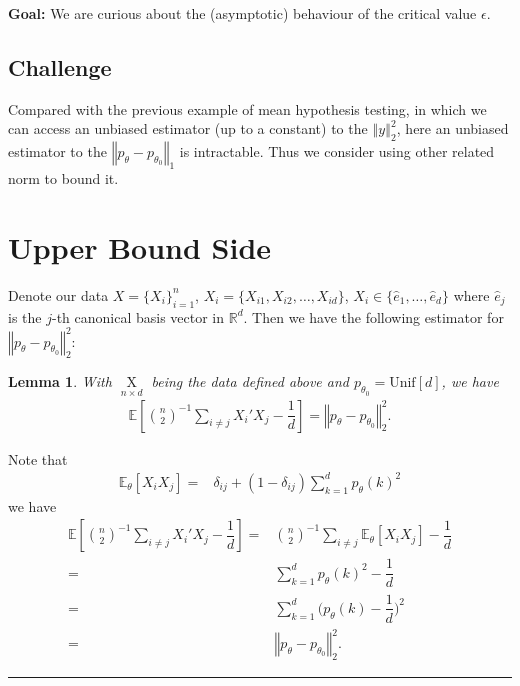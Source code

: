 \documentclass[twoside,12pt]{article}
\newtheorem{lemma}[theorem]{Lemma}
\newenvironment{proof}{{\bf Proof:}}{\hfill\rule{2mm}{2mm}}
\begin{document}
\textbf{Goal:} We are curious about the (asymptotic) behaviour of the critical value $ \epsilon  $.

\subsection{Challenge}

Compared with the previous example of mean hypothesis testing, in which we can access an unbiased estimator (up to a constant) to the $ \left\Vert y \right\Vert _2^2 $, here an unbiased estimator to the $ \left\Vert p_\theta -p_{\theta _0}  \right\Vert  _1 $ is intractable. Thus we consider using other related norm to bound it.






\section{Upper Bound Side}



Denote our data $ X = \{X_i\}_{i=1}^n $, $ X_i = \{X_{i1},X_{i2},\ldots,X_{id}\} $, $ X_i \in \{\hat{e}_1,\ldots,\hat{e}_{d}\} $ where $ \hat{e}_{j} $ is the $ j $-th canonical basis vector in $ \mathbb{R}^d $. Then we have the following estimator for $ \left\Vert p_\theta - p_{\theta _0} \right\Vert _2^2 $:

\begin{lemma}
   With $ \mathop{ X }\limits_{n\times d}  $ being the data defined above and $ p_{\theta _0} = \mathrm{ Unif }[d] $, we have
   \begin{align*}
      \mathbb{E}\left[ \binom{n}{2}^{-1}\sum_{i\neq j}X_i'X_j - \dfrac{ 1 }{ d } \right] = \left\Vert p_\theta -p_{\theta _0} \right\Vert _2^2  .
   \end{align*}
   
\end{lemma}

\begin{proof}
   Note that
   \begin{align*}
      \mathbb{E}_\theta \left[ X_iX_j \right]  =& \delta _{ij} + (1-\delta _{ij})\sum_{k=1}^dp_\theta (k)^2
   \end{align*}
   we have
   \begin{align*}
      \mathbb{E}\left[ \binom{n}{2}^{-1}\sum_{i\neq j}X_i'X_j - \dfrac{ 1 }{ d } \right] =& \binom{n}{2}^{-1}\sum_{i\neq j}\mathbb{E}_\theta \left[ X_iX_j \right] - \dfrac{ 1 }{ d }\\
      =& \sum_{k=1}^dp_\theta (k)^2 - \dfrac{ 1 }{ d }\\
      =& \sum_{k=1}^d \big( p_\theta (k) - \dfrac{ 1 }{ d } \big)^2\\
      =& \left\Vert p_\theta -p_{\theta _0} \right\Vert _2^2.
   \end{align*}
   
   
\end{proof}
\end{document}
